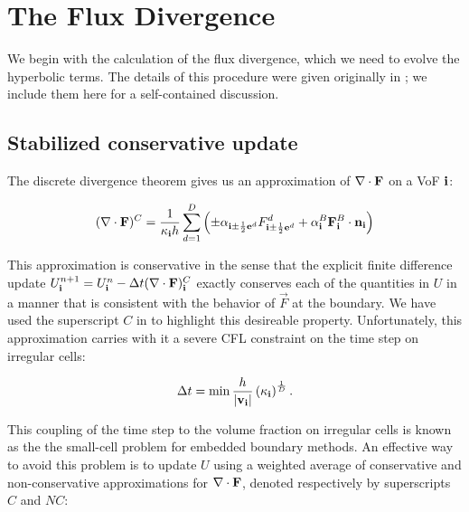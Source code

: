 \section{The Flux Divergence\label{sec:DivF}}

We begin with the calculation of the flux divergence, which we need to 
evolve the hyperbolic terms. The details of this procedure were given 
originally in \cite{???}; we include them here for a self-contained 
discussion. 

\subsection{Stabilized conservative update}
The discrete divergence theorem  gives us an 
approximation of $\nabla\cdot{\mathbf{F}}$ on a VoF ${\bf i}$:

\begin{equation}
(\nabla\cdot{\mathbf{F}})^C = \frac{1}{\kappa_{\bf i} h}
   \sum_{d=1}^D \left(\pm\alpha_{{\bf i}\pm\frac{1}{2}{\bf e}^d}F^d_{{\bf i}\pm\frac{1}{2}{\bf e}^d} + 
                      \alpha_{\bf i}^B\mathbf{F}_{\bf i}^B\cdot\mathbf{n}_{\bf i}\right) \label{eq:conservativeDivF}
\end{equation}

\noindent
This approximation is conservative in the sense that the explicit finite 
difference update $U^{n+1}_{\bf i} = U^n_{\bf i} - \Delta t (\nabla\cdot{\mathbf{F}})^C_{\bf i} $ exactly 
conserves each of the quantities in $U$ in a manner that is consistent with 
the behavior of $\vec{F}$ at the boundary. %
%
%
We have used the superscript $C$ in  to highlight
this desireable property. Unfortunately, this approximation carries with it a
severe CFL constraint on the time step on irregular cells:

\begin{equation}
\Delta t = \min \frac{h}{|\mathbf{v}_{\bf i}|}\left(\kappa_{\bf i}\right)^{\frac{1}{D}}. \label{eq:smallCellCFL}
\end{equation}

\noindent
This coupling of the time step to the volume fraction on irregular cells is 
known as the the small-cell problem for embedded boundary methods. An effective 
way to avoid this problem is to update $U$ using a weighted average of 
conservative and non-conservative approximations for $\nabla\cdot{\mathbf{F}}$, 
denoted respectively by superscripts $C$ and $NC$:

